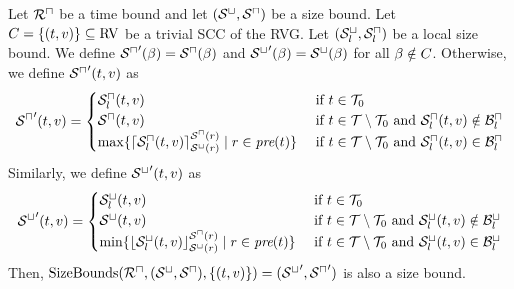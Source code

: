 \begin{theorem}
  Let ${\mathcal{R}^\sqcap}$ be a time bound and let ${({\mathcal{S}^\sqcup}, {\mathcal{S}^\sqcap})}$ be a size bound.
  Let $C = \lbrace (t,v) \rbrace \subseteq \text{RV}$ be a trivial SCC of the RVG.
  Let ${({\mathcal{S}^\sqcup_l}, {\mathcal{S}^\sqcap_l})}$ be a local size bound.
  We define ${\mathcal{S}^\sqcap}'(\beta) = {\mathcal{S}^\sqcap}(\beta)$ and ${\mathcal{S}^\sqcup}'(\beta) = {\mathcal{S}^\sqcup}(\beta)$ for all $\beta \notin C$.
  Otherwise, we define ${\mathcal{S}^\sqcap}'(t,v)$ as
  \[ {\mathcal{S}^\sqcap}'(t,v) =
  \begin{cases}
    {\mathcal{S}^\sqcap_l}(t, v) & \text{ if } t \in \mathcal{T}_0 \\
    {\mathcal{S}^\sqcap}(t, v) & \text{ if } t \in \mathcal{T} \setminus \mathcal{T}_0 \text{ and } {\mathcal{S}^\sqcap_l}(t,v) \notin \mathcal{B}^\sqcap_l \\
    \max \lbrace  \lceil {\mathcal{S}^\sqcap_l}(t,v) \rceil^{{\mathcal{S}^\sqcap}(r)}_{{\mathcal{S}^\sqcup}(r)} \mid r \in \emph{pre}(t) \rbrace & \text{ if } t \in \mathcal{T} \setminus \mathcal{T}_0 \text{ and } {\mathcal{S}^\sqcap_l}(t,v) \in \mathcal{B}^\sqcap_l \\
  \end{cases}
  \]
  Similarly, we define ${\mathcal{S}^\sqcup}'(t,v)$ as
  \[ {\mathcal{S}^\sqcup}'(t,v) =
  \begin{cases}
    {\mathcal{S}^\sqcup_l}(t, v) & \text{ if } t \in \mathcal{T}_0 \\
    {\mathcal{S}^\sqcup}(t, v) & \text{ if } t \in \mathcal{T} \setminus \mathcal{T}_0 \text{ and } {\mathcal{S}^\sqcup_l}(t,v) \notin \mathcal{B}^\sqcup_l \\
    \min \lbrace  \lfloor {\mathcal{S}^\sqcup_l}(t,v) \rfloor^{{\mathcal{S}^\sqcap}(r)}_{{\mathcal{S}^\sqcup}(r)} \mid r \in \emph{pre}(t) \rbrace & \text{ if } t \in \mathcal{T} \setminus \mathcal{T}_0 \text{ and } {\mathcal{S}^\sqcup_l}(t,v) \in \mathcal{B}^\sqcup_l \\
  \end{cases}
  \]
  Then, $\text{SizeBounds}({\mathcal{R}^\sqcap}, {({\mathcal{S}^\sqcup}, {\mathcal{S}^\sqcap})}, \lbrace (t,v) \rbrace) = ({\mathcal{S}^\sqcup}', {\mathcal{S}^\sqcap}')$ is also a size bound.
\end{theorem}
